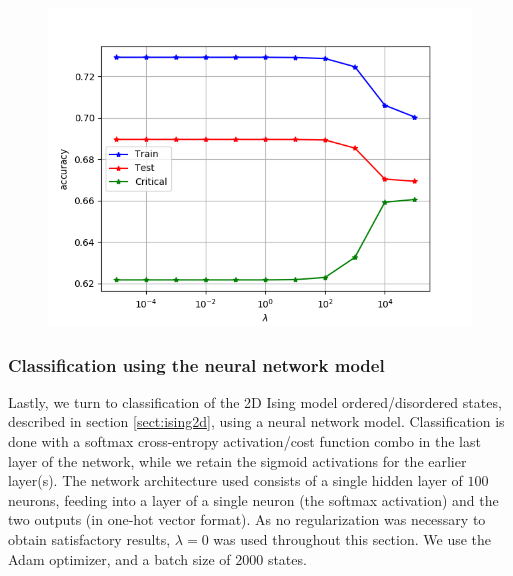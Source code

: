 \documentclass[a4paper, twocolumn]{article}
\begin{document}
\begin{figure}[h!]
\centering
 \includegraphics[width=1\linewidth]{logReg_acc_vs_regstrength_Final.png}
 \label{MehtaComparison}
\end{figure}

\begin{figure}[h!]
\centering
 \label{logRegNoIntercept}
\end{figure}

\subsubsection{Classification using the neural network model}
Lastly, we turn to classification of the 2D Ising model ordered/disordered states, described in section \ref{sect:ising2d}, using a neural network model. Classification is done with a softmax cross-entropy activation/cost function combo in the last layer of the network, while we retain the sigmoid activations for the earlier layer(s). The network architecture used consists of a single hidden layer of $100$ neurons, feeding into a layer of a single neuron (the softmax activation) and the two outputs (in one-hot vector format). As no regularization was necessary to obtain satisfactory results, $\lambda=0$ was used throughout this section. We use the Adam optimizer, and a batch size of $2000$ states. 
\end{document}
